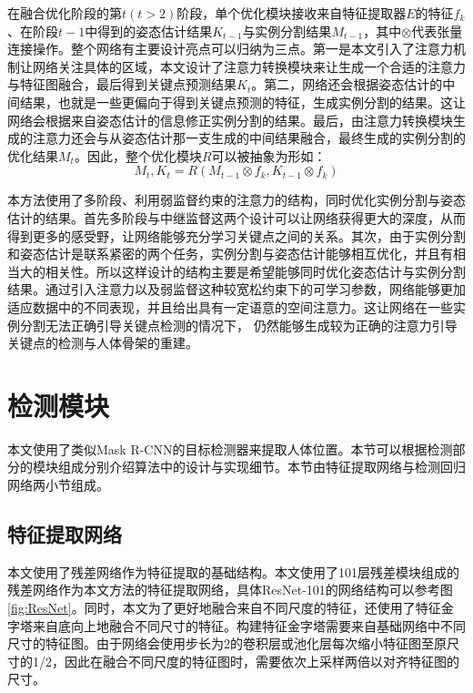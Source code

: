 在融合优化阶段的第$t(t>2)$阶段，单个优化模块接收来自特征提取器$E$的特征$f_k$、在阶段$t-1$中得到的姿态估计结果$K_{t-1}$与实例分割结果$M_{t-1}$，其中$\otimes$代表张量连接操作。整个网络有主要设计亮点可以归纳为三点。第一是本文引入了注意力机制让网络关注具体的区域，本文设计了注意力转换模块来让生成一个合适的注意力与特征图融合，最后得到关键点预测结果$K_t$。第二，网络还会根据姿态估计的中间结果，也就是一些更偏向于得到关键点预测的特征，生成实例分割的结果。这让网络会根据来自姿态估计的信息修正实例分割的结果。最后，由注意力转换模块生成的注意力还会与从姿态估计那一支生成的中间结果融合，最终生成的实例分割的优化结果$M_t$。因此，整个优化模块$R$可以被抽象为形如：
\begin{equation}
\label{def:refinenet}
M_t, K_t = R(M_{t-1}\otimes f_k, K_{t-1}\otimes f_k)
\end{equation}

本方法使用了多阶段、利用弱监督约束的注意力的结构，同时优化实例分割与姿态估计的结果。首先多阶段与中继监督这两个设计可以让网络获得更大的深度，从而得到更多的感受野，让网络能够充分学习关键点之间的关系\cite{wei2016convolutional}。其次，由于实例分割和姿态估计是联系紧密的两个任务，实例分割与姿态估计能够相互优化，并且有相当大的相关性。所以这样设计的结构主要是希望能够同时优化姿态估计与实例分割结果。通过引入注意力以及弱监督这种较宽松约束下的可学习参数，网络能够更加适应数据中的不同表现，并且给出具有一定语意的空间注意力\cite{wang2017residual}。这让网络在一些实例分割无法正确引导关键点检测的情况下， 仍然能够生成较为正确的注意力引导关键点的检测与人体骨架的重建。

\section{检测模块}
\label{sec:detectionstage}
本文使用了类似Mask R-CNN\cite{He2017Mask}的目标检测器来提取人体位置。本节可以根据检测部分的模块组成分别介绍算法中的设计与实现细节。本节由特征提取网络与检测回归网络两小节组成。

\subsection{特征提取网络}
\label{subsec:featextract}
本文使用了残差网络作为特征提取的基础结构。本文使用了101层残差模块组成的残差网络作为本文方法的特征提取网络，具体ResNet-101的网络结构可以参考图\ref{fig:ResNet}。同时，本文为了更好地融合来自不同尺度的特征，还使用了特征金字塔\cite{Lin2016Feature}来自底向上地融合不同尺寸的特征。构建特征金字塔需要来自基础网络中不同尺寸的特征图。由于网络会使用步长为2的卷积层或池化层每次缩小特征图至原尺寸的1/2，因此在融合不同尺度的特征图时，需要依次上采样两倍以对齐特征图的尺寸。

